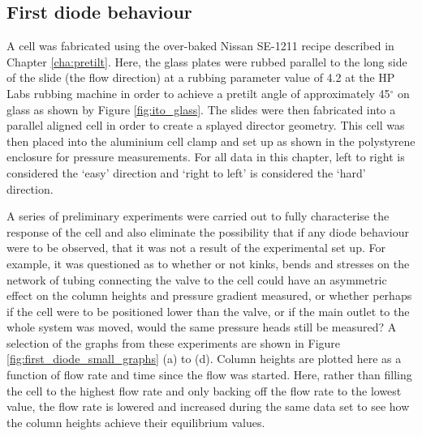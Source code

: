 \subsection{First diode behaviour}
\label{sec:first_diode}
A cell was fabricated using the over-baked Nissan SE-1211 recipe described in Chapter \ref{cha:pretilt}. Here, the glass plates were rubbed parallel to the long side of the slide (the flow direction) at a rubbing parameter value of 4.2 at the HP Labs rubbing machine in order to achieve a pretilt angle of approximately 45$^{\circ}$ on glass as shown by Figure \ref{fig:ito_glass}. The slides were then fabricated into a parallel aligned cell in order to create a splayed director geometry. This cell was then placed into the aluminium cell clamp and set up as shown in the polystyrene enclosure for pressure measurements. For all data in this chapter, left to right is considered the `easy' direction and `right to left' is considered the `hard' direction.

A series of preliminary experiments were carried out to fully characterise the response of the cell and also eliminate the possibility that if any diode behaviour were to be observed, that it was not a result of the experimental set up. For example, it was questioned as to whether or not kinks, bends and stresses on the network of tubing connecting the valve to the cell could have an asymmetric effect on the column heights and pressure gradient measured, or whether perhaps if the cell were to be positioned lower than the valve, or if the main outlet to the whole system was moved, would the same pressure heads still be measured? A selection of the graphs from these experiments are shown in Figure \ref{fig:first_diode_small_graphs} (a) to (d). Column heights are plotted here as a function of flow rate and time since the flow was started. Here, rather than filling the cell to the highest flow rate and only backing off the flow rate to the lowest value, the flow rate is lowered and increased during the same data set to see how the column heights achieve their equilibrium values.

